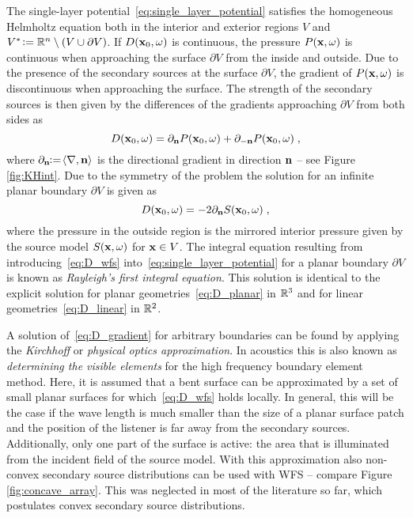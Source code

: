 The single-layer potential~\eqref{eq:single_layer_potential} satisfies the homogeneous
Helmholtz equation
both in the interior and exterior regions $V$ and $V^*
\mathrel{\!\mathop:}= \mathbb{R}^n \setminus (V \cup \partial V)$.  If $D(\mathbf{x}_0,\omega)$ is
continuous, the pressure $P(\mathbf{x},\omega)$ is continuous when approaching the
surface $\partial V$ from the inside and outside.  Due to the presence of the
secondary sources at the surface $\partial V$, the gradient of $P(\mathbf{x},\omega)$ is
discontinuous when approaching the surface.
The strength of the secondary sources is then given by the differences of the
gradients approaching $\partial V$ from both sides
as 
%
\begin{equation}
    D(\x_0,\omega) = \partial_\n
    P(\x_0,\omega) + \partial_{-\n} P(\x_0,\omega)\qc
    \label{eq:D_gradient}
\end{equation}
%
where
$\partial_{\mathbf{n}}\!\mathrel{\!\mathop:}=\!\langle\nabla,\mathbf{n}\rangle$ is the directional gradient
in direction $\mathbf{n}$ -- see Figure\,\ref{fig:KHint}.
Due to the symmetry of the problem the solution for an infinite planar
boundary $\partial V$ is given as 
%
\begin{equation}
    D(\x_0,\omega) = -2 \partial_\n S(\x_0,\omega)\qc
    \label{eq:D_wfs}
\end{equation}
%
where the pressure in the outside region is the mirrored interior pressure given by the
source model $S(\mathbf{x},\omega)$ for $\mathbf{x} \in V$.  The
integral equation resulting from introducing~\eqref{eq:D_wfs}
into~\eqref{eq:single_layer_potential} for a planar boundary $\partial V$ is known as
{\em Rayleigh's first integral equation}. This solution is identical
to the explicit solution for planar geometries~\eqref{eq:D_planar} in $\mathbb{R}^3$ and for
linear geometries~\eqref{eq:D_linear} in $\mathbb{R}^2$.

A solution of~\eqref{eq:D_gradient} for  arbitrary boundaries can be
found by applying the \emph{Kirchhoff} or \emph{physical optics
approximation}.
In acoustics this is also known as \emph{determining the visible elements} for
the high frequency boundary element
method.
Here, it is assumed that a
bent surface can be approximated by a set of small planar surfaces for
which~\eqref{eq:D_wfs} holds locally.  In general, this will be the case if the
wave length is much smaller than the size of a planar surface patch and the
position of the listener is far away from the secondary
sources.
Additionally, only one part of the surface is active: the area that is
illuminated from the incident field of the source model.
\FloatBarrier %
\noindent With this approximation
also non-convex secondary
source distributions can be used with
\ac{WFS} -- compare
Figure\,\ref{fig:concave_array}.
This was neglected in most of the literature so far, which postulates
convex secondary source
distributions.


